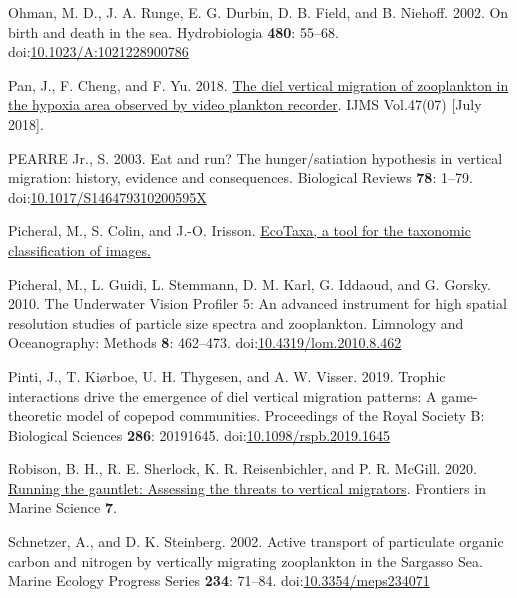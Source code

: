 \documentclass[
]{article}
\newlength{\cslhangindent}
\newlength{\cslentryspacingunit} %
\newenvironment{CSLReferences}[2] %
 {%
  \setlength{\parindent}{0pt}
  \ifodd #1
  \let\oldpar\par
  \def\par{\hangindent=\cslhangindent\oldpar}
  \fi
  \setlength{\parskip}{#2\cslentryspacingunit}
 }%
 {}
\begin{document}
\begin{CSLReferences}{1}{0}
\leavevmode{}%
Ohman, M. D., J. A. Runge, E. G. Durbin, D. B. Field, and B. Niehoff.
2002. On birth and death in the sea. Hydrobiologia \textbf{480}: 55--68.
doi:\href{https://doi.org/10.1023/A:1021228900786}{10.1023/A:1021228900786}

\leavevmode{}%
Pan, J., F. Cheng, and F. Yu. 2018.
\href{http://nopr.niscpr.res.in/handle/123456789/44619}{The diel
vertical migration of zooplankton in the hypoxia area observed by video
plankton recorder}. IJMS Vol.47(07) {[}July 2018{]}.

\leavevmode{}%
PEARRE Jr., S. 2003. Eat and run? The hunger/satiation hypothesis in
vertical migration: history, evidence and consequences. Biological
Reviews \textbf{78}: 1--79.
doi:\href{https://doi.org/10.1017/S146479310200595X}{10.1017/S146479310200595X}

\leavevmode{}%
Picheral, M., S. Colin, and J.-O. Irisson.
\href{http://ecotaxa.obs-vlfr.fr}{EcoTaxa, a tool for the taxonomic
classification of images.}

\leavevmode{}%
Picheral, M., L. Guidi, L. Stemmann, D. M. Karl, G. Iddaoud, and G.
Gorsky. 2010. The Underwater Vision Profiler 5: An advanced instrument
for high spatial resolution studies of particle size spectra and
zooplankton. Limnology and Oceanography: Methods \textbf{8}: 462--473.
doi:\href{https://doi.org/10.4319/lom.2010.8.462}{10.4319/lom.2010.8.462}

\leavevmode{}%
Pinti, J., T. Kiørboe, U. H. Thygesen, and A. W. Visser. 2019. Trophic
interactions drive the emergence of diel vertical migration patterns: A
game-theoretic model of copepod communities. Proceedings of the Royal
Society B: Biological Sciences \textbf{286}: 20191645.
doi:\href{https://doi.org/10.1098/rspb.2019.1645}{10.1098/rspb.2019.1645}

\leavevmode{}%
Robison, B. H., R. E. Sherlock, K. R. Reisenbichler, and P. R. McGill.
2020.
\href{https://www.frontiersin.org/articles/10.3389/fmars.2020.00064}{Running
the gauntlet: Assessing the threats to vertical migrators}. Frontiers in
Marine Science \textbf{7}.

\leavevmode{}%
Schnetzer, A., and D. K. Steinberg. 2002. Active transport of
particulate organic carbon and nitrogen by vertically migrating
zooplankton in the Sargasso Sea. Marine Ecology Progress Series
\textbf{234}: 71--84.
doi:\href{https://doi.org/10.3354/meps234071}{10.3354/meps234071}


\end{CSLReferences}
\end{document}
